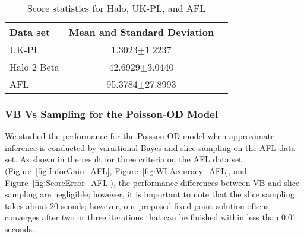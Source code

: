 \ENDCOMMENT


\COMMENT
\begin{table}
\caption{Score statistics for Halo, UK-PL, and AFL}
\begin{center}
\small
\begin{tabular}{|l|c|c|}
  \hline
  Data set          & Mean and Standard Deviation\\
  \hline
  UK-PL             &  1.3023$\pm$1.2237 \\
  Halo 2 Beta     & 42.6929$\pm$3.0440 \\
  AFL                 &95.3784$\pm$27.8993 \\
  \hline
\end{tabular}
\label{table:datasetStatistics}
\end{center}
\end{table}
\ENDCOMMENT


\subsubsection{VB Vs Sampling for the Poisson-OD Model}
We studied the performance for the Poisson-OD model when approximate inference is conducted by varaitional Bayes and slice sampling on the AFL data set. As shown in the result for three criteria on the AFL data set (Figure~\ref{fig:InforGain_AFL}, Figure~\ref{fig:WLAccuracy_AFL}, and Figure~\ref{fig:ScoreError_AFL}), the performance differences between VB and slice sampling are negligible; however, it is important to note that the slice sampling takes about 20 seonds; however, our proposed fixed-point solution oftens converges after two or three iterations that can be finished within less  than 0.01 seconds. 

